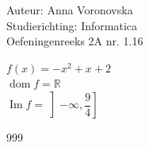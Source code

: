 \documentclass[a4paper]{article}
\begin{document}
  
\noindent \large Auteur: Anna Voronovska \\
\noindent \large Studierichting: Informatica\\
\noindent \large Oefeningenreeks 2A nr. 1.16\\

\medskip

\normalsize

$ f(x) = -x^2 + x + 2 $\\

$ \operatorname{dom} f = \mathbb{R} $\\

$ \operatorname{Im} f = \left]-\infty, \dfrac{9}{4} \right] $

\begin{thebibliography}{999}
\end{thebibliography}
\end{document}
